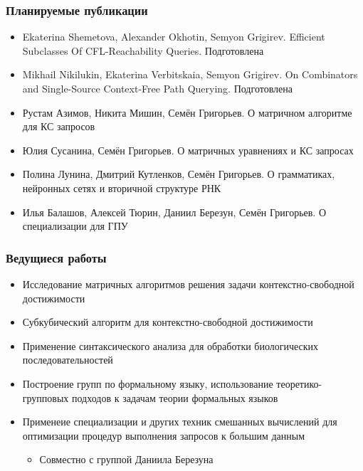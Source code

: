 \documentclass[xcolor=table]{beamer}
\begin{document}
\begin{frame}[fragile]

  \frametitle{Планируемые публикации}
\begin{itemize}
      \item[\faHourglassHalf] Ekaterina Shemetova, Alexander Okhotin, Semyon Grigirev. Efficient Subclasses Of CFL-Reachability Queries. Подготовлена
      \item[\faHourglassHalf] Mikhail Nikilukin, Ekaterina Verbitskaia, Semyon Grigirev. On Combinators and Single-Source Context-Free Path Querying. Подготовлена
      \pause
      \item[\faGears] Рустам Азимов, Никита Мишин, Семён Григорьев. О матричном алгоритме для КС запросов
      \item[\faGears] Юлия Сусанина, Семён Григорьев. О матричных уравнениях и КС запросах
      \item[\faGears] Полина Лунина, Дмитрий Кутленков, Семён Григорьев. О грамматиках, нейронных сетях и вторичной структуре РНК
      \item[\faGears] Илья Балашов, Алексей Тюрин, Даниил Березун, Семён Григорьев. О специализации для ГПУ
\end{itemize}
\end{frame}

\begin{frame}[fragile]

  \frametitle{Ведущиеся работы}
\begin{itemize}
      \item Исследование матричных алгоритмов решения задачи контекстно-свободной достижимости
      \item Субкубический алгоритм для контекстно-свободной достижимости
      \item Применение синтаксического анализа для обработки биологических последовательностей
      \item Построение групп по формальному языку, использование теоретико-групповых подходов к задачам теории формальных языков
      \item Применеие специализации и других техник смешанных вычислений для оптимизации процедур выполнения запросов к большим данным
      \begin{itemize}
        \item Совместно с группой Даниила Березуна
      \end{itemize}
\end{itemize}
\end{frame}
\end{document}
